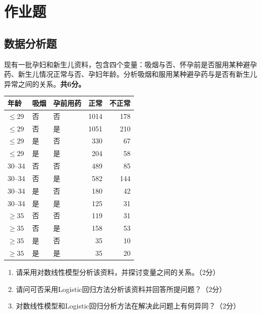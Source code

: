 
\label{chapter:4}

\par\addvspace{8pt}\noindent\begin{minipage}{\linewidth}

\section{作业题}

\subsection{数据分析题}


现有一批孕妇和新生儿资料，包含四个变量：吸烟与否、怀孕前是否服用某种避孕药、新生儿情况正常与否、孕妇年龄。分析吸烟和服用某种避孕药与是否有新生儿异常之间的关系。\textbf{共6分。}

\begin{center}\small\setlength{\tabcolsep}{4pt}\renewcommand{\arraystretch}{1.22}\begin{tabular}{@{}lllrr@{}}
\toprule
年龄 & 吸烟 & 孕前用药 & 正常 & 不正常 \\
\midrule

\(\le29\) & 否 & 否 & 1014 & 178 \\
\(\le29\) & 否 & 是 & 1051 & 210 \\
\(\le29\) & 是 & 否 & 330 & 67 \\
\(\le29\) & 是 & 是 & 204 & 58 \\
30--34 & 否 & 否 & 489 & 85 \\
30--34 & 否 & 是 & 582 & 144 \\
30--34 & 是 & 否 & 180 & 42 \\
30--34 & 是 & 是 & 125 & 31 \\
\(\ge35\) & 否 & 否 & 119 & 31 \\
\(\ge35\) & 否 & 是 & 158 & 53 \\
\(\ge35\) & 是 & 否 & 35 & 10 \\
\(\ge35\) & 是 & 是 & 35 & 20 \\
\bottomrule\end{tabular}\end{center}

\begin{enumerate}
\def\labelenumi{\arabic{enumi}.}
\tightlist
\item
  请采用对数线性模型分析该资料，并探讨变量之间的关系。（2分）
\item
  请问可否采用Logistic回归方法分析该资料并回答所提问题？（2分）
\item
  对数线性模型和Logistic回归分析方法在解决此问题上有何异同？（2分）
\end{enumerate}



\end{minipage}\par\vspace{5pt}

